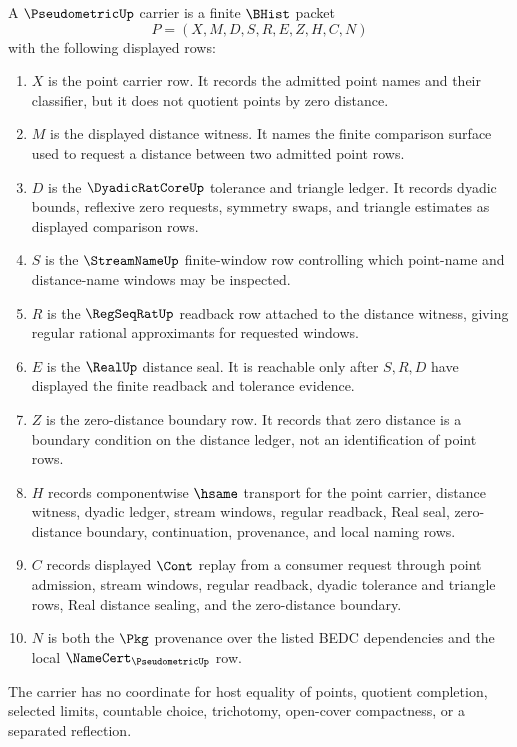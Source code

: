 \begin{definition}
\label{def:pseudometric-carrier}
A $\PseudometricUp$ carrier is a finite $\BHist$ packet
$$
P=(X,M,D,S,R,E,Z,H,C,N)
$$
with the following displayed rows:
\begin{enumerate}
\item $X$ is the point carrier row. It records the admitted point names and their classifier, but it does not quotient points by zero distance.
\item $M$ is the displayed distance witness. It names the finite comparison surface used to request a distance between two admitted point rows.
\item $D$ is the $\DyadicRatCoreUp$ tolerance and triangle ledger. It records dyadic bounds, reflexive zero requests, symmetry swaps, and triangle estimates as displayed comparison rows.
\item $S$ is the $\StreamNameUp$ finite-window row controlling which point-name and distance-name windows may be inspected.
\item $R$ is the $\RegSeqRatUp$ readback row attached to the distance witness, giving regular rational approximants for requested windows.
\item $E$ is the $\RealUp$ distance seal. It is reachable only after $S,R,D$ have displayed the finite readback and tolerance evidence.
\item $Z$ is the zero-distance boundary row. It records that zero distance is a boundary condition on the distance ledger, not an identification of point rows.
\item $H$ records componentwise $\hsame$ transport for the point carrier, distance witness, dyadic ledger, stream windows, regular readback, Real seal, zero-distance boundary, continuation, provenance, and local naming rows.
\item $C$ records displayed $\Cont$ replay from a consumer request through point admission, stream windows, regular readback, dyadic tolerance and triangle rows, Real distance sealing, and the zero-distance boundary.
\item $N$ is both the $\Pkg$ provenance over the listed BEDC dependencies and the local $\NameCert_{\PseudometricUp}$ row.
\end{enumerate}
The carrier has no coordinate for host equality of points, quotient completion, selected limits, countable choice, trichotomy, open-cover compactness, or a separated reflection.
\end{definition}


